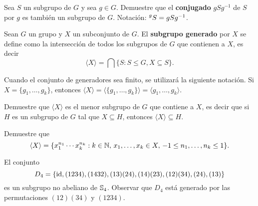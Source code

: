 \begin{exercise}
	Sea $S$ un subgrupo de $G$ y sea $g\in G$. Demuestre que el \textbf{conjugado} $gSg^{-1}$ 
	de $S$ por $g$ es
	también un subgrupo de $G$. Notación: $\prescript{g}{}S=gSg^{-1}$. 
\end{exercise}

\begin{definition}
	Sean $G$ un grupo y $X$ un subconjunto de $G$. El \textbf{subgrupo
	generado} por $X$ se define como la intersección de todos los subgrupos de $G$ que contienen a $X$, es decir  
	\[
		\langle X\rangle=\bigcap\{S:S\leq G,X\subseteq S\}.
	\]
\end{definition}

Cuando el conjunto de generadores sea finito, se utilizará la siguiente notación. Si $X=\{g_1,\dots,g_k\}$, entonces $\langle
X\rangle=\langle\{g_1,\dots,g_k\}\rangle=\langle g_1,\dots,g_k\rangle$. 	

\begin{exercise}
Demuestre que $\langle
X\rangle$ es el menor subgrupo de $G$ que contiene a $X$, es decir que si $H$ es un subgrupo de $G$ tal que $X\subseteq H$, entonces $\langle X\rangle\subseteq H$.  
\end{exercise}

\begin{exercise}
Demuestre que 
\[
	\langle X\rangle=\{x_1^{n_1}\cdots x_k^{n_k}:k\in\mathbb{N},\,x_1,\dots,x_k\in X,\,-1\leq n_1,\dots,n_k\leq 1\}.
\]
\end{exercise}


\begin{example}
El conjunto
\[
D_4=\{\operatorname{id},(1234),(1432),(13)(24),(14)(23),(12)(34),(24),(13)\}
\]
es un subgrupo no abeliano de $\mathbb{S}_4$.	Observar que $D_4$ está generado por las permutaciones 
$(12)(34)$ y $(1234)$. 	
\end{example}

